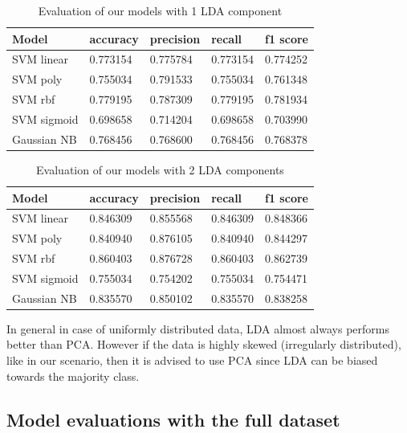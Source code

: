 \documentclass[a4paper,12pt]{article}
\begin{document}
\begin{table}[H]
\begin{tabular}{ |p{6cm}||p{2cm}|p{2cm}|p{2cm}|p{2cm}| }
  \hline
  Model& accuracy & precision  &  recall & f1 score \\
  \hline
  SVM linear           &0.773154&   0.775784&  0.773154&  0.774252\\
  SVM poly             &0.755034&   0.791533&  0.755034&  0.761348\\
  SVM rbf              &0.779195&   0.787309&  0.779195&  0.781934\\
  SVM sigmoid          &0.698658&   0.714204&  0.698658&  0.703990\\
  Gaussian NB          &0.768456&   0.768600&  0.768456&  0.768378\\
  \hline
\end{tabular}
\caption{Evaluation of our models with 1 LDA component}
\label{tab:lda1}
\end{table}

\begin{table}[H]
\begin{tabular}{ |p{6cm}||p{2cm}|p{2cm}|p{2cm}|p{2cm}| }
  \hline
  Model& accuracy & precision  &  recall & f1 score \\
  \hline
  SVM linear           &0.846309&   0.855568&  0.846309&  0.848366\\
  SVM poly             &0.840940&   0.876105&  0.840940&  0.844297\\
  SVM rbf              &0.860403&   0.876728&  0.860403&  0.862739\\
  SVM sigmoid          &0.755034&   0.754202&  0.755034&  0.754471\\
  Gaussian NB          &0.835570&   0.850102&  0.835570&  0.838258\\
  \hline
\end{tabular}
\caption{Evaluation of our models with 2 LDA components}
\label{tab:lda2}
\end{table}


\noindent In general in case of uniformly distributed data, LDA almost always performs better than PCA. However if the data is highly skewed (irregularly distributed), like in our scenario, then it is advised to use PCA since LDA can be biased towards the majority class. \cite{pca-lda}

\newpage
\subsection{Model evaluations with the full dataset}
\end{document}
